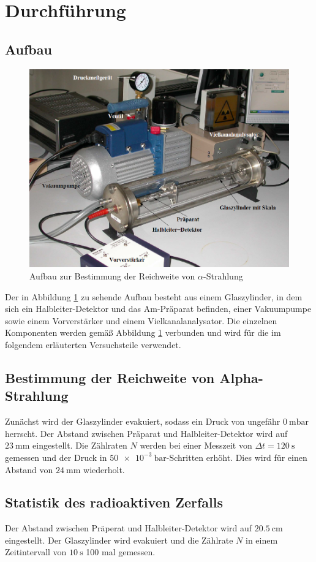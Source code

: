 \section{Durchführung}
\label{sec:Durchführung}
\subsection{Aufbau}
\begin{figure}[H]
  \includegraphics[scale=0.6]{Text/Bilder/Aufbau.PNG}
  \caption{Aufbau zur Bestimmung der Reichweite von $\alpha$-Strahlung\cite[3]{sample}}
  \label{fig:Aufbau}
\end{figure}
\noindent
Der in Abbildung \ref{fig:Aufbau} zu sehende Aufbau besteht aus einem Glaszylinder, in dem sich ein Halbleiter-Detektor und das Am-Präparat befinden, einer Vakuumpumpe sowie
einem Vorverstärker und einem Vielkanalanalysator. Die einzelnen Komponenten werden gemäß Abbildung \ref{fig:Aufbau} verbunden und wird für die im folgendem
erläuterten Versuchsteile verwendet.

\subsection{Bestimmung der Reichweite von Alpha-Strahlung}
Zunächst wird der Glaszylinder evakuiert, sodass ein Druck von ungefähr $\SI{0}{\milli \bar} $ herrscht. Der Abstand zwischen Präparat und
Halbleiter-Detektor wird auf $\SI{23}{\milli \meter}$ eingestellt. Die Zählraten $N$ werden bei einer Messzeit von $\Delta t=\SI{120}{\second}$ gemessen und der Druck in
$\SI{50e-3}{\bar}$-Schritten erhöht.
Dies wird für einen Abstand von $\SI{24}{\milli \meter}$ wiederholt.

\subsection{Statistik des radioaktiven Zerfalls}
Der Abstand zwischen Präperat und Halbleiter-Detektor wird auf $\SI{20,5}{\cm}$ eingestellt.
Der Glaszylinder wird evakuiert und die Zählrate $N$ in einem Zeitintervall von $\SI{10}{\second}$ 100 mal gemessen.

